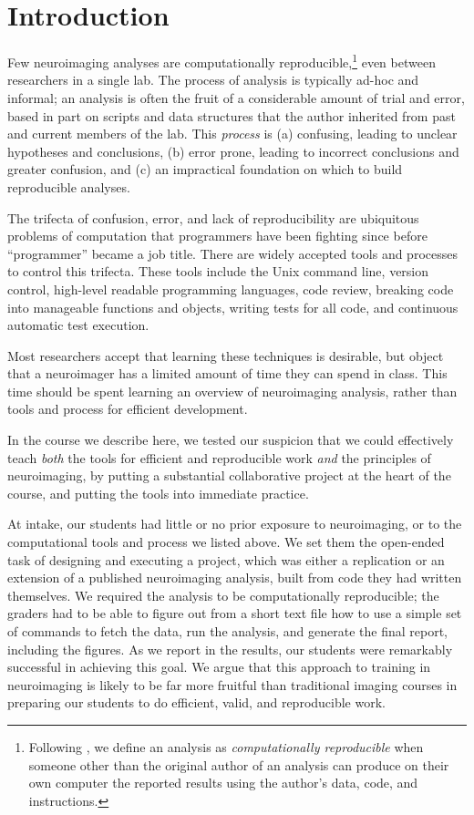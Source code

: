 \section{Introduction}

Few neuroimaging analyses are computationally reproducible,\footnote{Following
\citet{buckheit1995wavelab}, we define an analysis as \emph{computationally
reproducible} when someone other than the original author of an analysis can
produce on their own computer the reported results using the author's data,
code, and instructions.}
even between researchers in a single lab.
The process of analysis is typically ad-hoc and informal; an analysis is often
the fruit of a considerable amount of trial and error, based in part on scripts
and data structures that the author inherited from past and current members of
the lab.
This \emph{process} is
(a) confusing, leading to unclear hypotheses and conclusions,
(b) error prone, leading to incorrect conclusions and greater confusion,
and (c) an impractical foundation on which to build reproducible analyses.

The trifecta of confusion, error, and lack of reproducibility are ubiquitous
problems of computation that programmers have been fighting since before ``programmer''
became a job title. There are widely accepted tools and processes to
control this trifecta. These tools include the Unix command line, version
control, high-level readable programming languages, code review, breaking code
into manageable functions and objects, writing tests for all code,  and
continuous automatic test execution.

Most researchers accept that learning these techniques is desirable, but
object that a neuroimager has a limited amount of time they can spend in
class.  This time should be spent learning an overview of neuroimaging
analysis, rather than tools and process for efficient development.

In the course we describe here, we tested our suspicion that we could
effectively teach \emph{both} the tools for efficient and reproducible work \emph{and}
the principles of neuroimaging, by putting a substantial collaborative project
at the heart of the course, and putting the tools into immediate practice.

At intake, our students had little or no prior exposure to neuroimaging,
or to the computational tools and process we listed above.  We set them the
open-ended task of designing and executing a project, which was either a
replication or an extension of a published neuroimaging analysis, built from
code they had written themselves.  We required the analysis to be computationally
reproducible; the graders had to be able to figure out from a short text file
how to use a simple set of commands to
fetch the data, run the analysis, and generate the final report, including the
figures.  As we report in the results, our students were remarkably
successful in achieving this goal.  We argue that this approach to
training in neuroimaging is likely to be far more fruitful than traditional
imaging courses in preparing our students to do efficient, valid, and
reproducible work.

